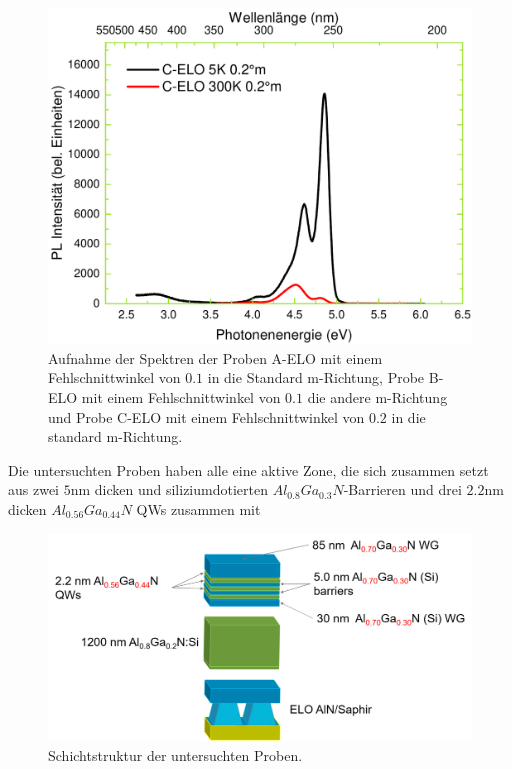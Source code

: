 \begin{figure}[htb]
\begin{minipage}[t]{0.30\textwidth}
  \end{minipage}
	\hfill
  \begin{minipage}[t]{0.30\textwidth}
    \centering
    \includegraphics[width=\linewidth]{Bilder/TS4045/celo.pdf}
  \end{minipage}
	\caption{Aufnahme der Spektren der Proben A-ELO mit einem Fehlschnittwinkel von $0.1$ in die Standard m-Richtung, Probe B-ELO mit einem Fehlschnittwinkel von $0.1$ die andere m-Richtung und Probe C-ELO mit einem Fehlschnittwinkel von $0.2$ in die standard m-Richtung. }
\end{figure}
%
Die untersuchten Proben haben alle eine aktive Zone, die sich zusammen setzt aus zwei $5$nm dicken und siliziumdotierten $ Al_{0.8}Ga_{0.3}N$-Barrieren und drei $2.2$nm dicken $ Al_{0.56}Ga_{0.44}N$ QWs zusammen mit 
%
\begin{figure}[htb]
\includegraphics[width=\linewidth]{Bilder/TS4045/ts4045.png}
\caption{Schichtstruktur der untersuchten Proben.}
\label{fig:offcut}
\end{figure}
